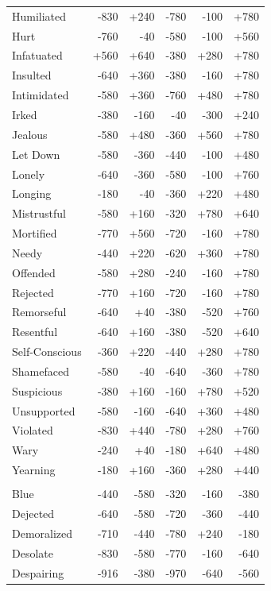 \begin{longtable}{@{}p{}rrrrr}
Humiliated & -830 & +240 & -780 & -100 & +780 \\
Hurt & -760 & -40 & -580 & -100 & +560 \\
Infatuated & +560 & +640 & -380 & +280 & +780 \\
Insulted & -640 & +360 & -380 & -160 & +780 \\
Intimidated & -580 & +360 & -760 & +480 & +780 \\
Irked & -380 & -160 & -40 & -300 & +240 \\
Jealous & -580 & +480 & -360 & +560 & +780 \\
Let Down & -580 & -360 & -440 & -100 & +480 \\
Lonely & -640 & -360 & -580 & -100 & +760 \\
Longing & -180 & -40 & -360 & +220 & +480 \\
Mistrustful & -580 & +160 & -320 & +780 & +640 \\
Mortified & -770 & +560 & -720 & -160 & +780 \\
Needy & -440 & +220 & -620 & +360 & +780 \\
Offended & -580 & +280 & -240 & -160 & +780 \\
Rejected & -770 & +160 & -720 & -160 & +780 \\
Remorseful & -640 & +40 & -380 & -520 & +760 \\
Resentful & -640 & +160 & -380 & -520 & +640 \\
Self-Conscious & -360 & +220 & -440 & +280 & +780 \\
Shamefaced & -580 & -40 & -640 & -360 & +780 \\
Suspicious & -380 & +160 & -160 & +780 & +520 \\
Unsupported & -580 & -160 & -640 & +360 & +480 \\
Violated & -830 & +440 & -780 & +280 & +760 \\
Wary & -240 & +40 & -180 & +640 & +480 \\
Yearning & -180 & +160 & -360 & +280 & +440 \\
\addlinespace[2pt]\multicolumn{6}{@{}l}{\textbf{Withdrawn \& Low Arousal} ($n=34$)} \\
Blue & -440 & -580 & -320 & -160 & -380 \\
Dejected & -640 & -580 & -720 & -360 & -440 \\
Demoralized & -710 & -440 & -780 & +240 & -180 \\
Desolate & -830 & -580 & -770 & -160 & -640 \\
Despairing & -916 & -380 & -970 & -640 & -560 \\

\end{longtable}
